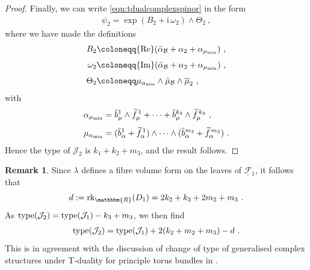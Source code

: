 \documentclass[a4paper, reqno, 11pt]{amsart}
\numberwithin{equation}{section}
\theoremstyle{definition}
\newtheorem{remark}[equation]{Remark}
\newcommand{\red}[1]{\underline{#1}}
\newcommand{\ii}{\mathrm{i}}
\newcommand{\IR}{\mathbbm{R}}
\newcommand{\cB}{{\mathcal B}}
\newcommand{\cF}{{\mathcal F}}
\newcommand{\cJ}{{\mathcal J}}
\newcommand{\rk}{\mathrm{rk}}
\theoremstyle{remark}
\begin{document}
\begin{proof}
Finally, we can write \eqref{eqn:tdualcomplexspinor} in the form
\begin{equation}
\begin{aligned}
    \psi_{2} = \exp(B_2+\ii\,\omega_2) \wedge \Theta_2 \ ,
\end{aligned}
\end{equation}
where we have made the definitions
\begin{equation}\label{eqn:J2spinorterms}
    \begin{aligned}
    B_2 &\coloneqq {\rm Re}(\ddot \alpha_\cB + \alpha_2 + \alpha_{\mu_{\rm mix}})\ ,\\[4pt]
    \omega_2 &\coloneqq {\rm Im}(\ddot \alpha_\cB + \alpha_2 +\alpha_{\mu_{\rm mix}})\ ,\\[4pt]
    \Theta_2 &\coloneqq \mu_{\alpha_{\rm mix}} \wedge \ddot\mu_\cB \wedge \overline{\mu}_2\ ,
\end{aligned}
\end{equation}
with
\begin{align}
    \alpha_{\mu_{\rm mix}}&=\ddot{b}_\mu^1 \wedge \widetilde{f}_\mu^{\,1} + \cdots +\ddot{b}_\mu^{k_3} \wedge \widetilde{f}_\mu^{\,k_3}\ ,\\[4pt]
    \mu_{\alpha_{\rm mix}}&=(\ddot b_\alpha^1 + \widetilde f_\alpha^{\,1}) \wedge \cdots \wedge (\ddot b_\alpha^{m_3} + \widetilde f_\alpha^{\,m_3})\ .
\end{align} 
Hence the type of $\cJ_2$ is $k_1 + k_2 + m_3$, and the result follows.
\end{proof}

\begin{remark}
Since $\lambda$ defines a fibre volume form on the leaves of $\red\cF{}_1$, it follows that $$d := \rk_\IR(D_1) = 2k_2 + k_3 + 2m_2 + m_3 \ . $$ As ${\rm type}(\cJ_2) = {\rm type}(\cJ_1) - k_3 + m_3 $, we then find
\begin{align}
    {\rm type}(\cJ_2) = {\rm type}(\cJ_1) + 2(k_2 + m_2 + m_3)-d \ .
\end{align}
This is in agreement with the discussion of change of type of generalised complex structures under T-duality for principle torus bundles in \cite[Example 4.3]{cavalcanti2011generalized}.
\end{remark}
\end{document}
